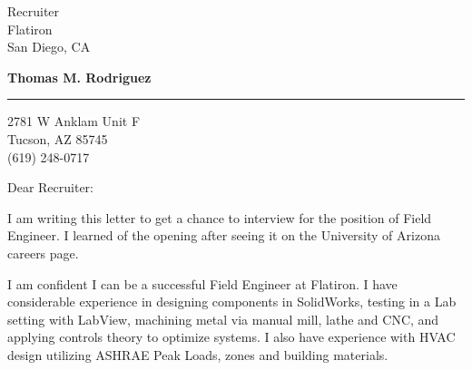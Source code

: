 \documentclass{letter} %
\begin{document}
\signature{Thomas M. Rodriguez}           %
\longindentation=0pt                       %
\let\raggedleft\raggedright                %
 
 
\begin{letter}{Recruiter \\
Flatiron \\
San Diego, CA}

\begin{center}
{\large\bf Thomas M. Rodriguez}
\end{center}
\medskip\hrule height 1pt
\begin{center}
{2781 W Anklam Unit F \\ Tucson, AZ 85745 \\ (619) 248-0717}
\end{center} \vfill %
 
 
\opening{Dear Recruiter:} 
 

\noindent I am writing this letter to get a chance to interview for the position of Field Engineer.  I learned of the opening after seeing it on the University of Arizona careers page.
 

\noindent I am confident I can be a successful Field Engineer at Flatiron.  I have considerable experience in designing components in SolidWorks, testing in a Lab setting with LabView, machining metal via manual mill, lathe and CNC, and applying controls theory to optimize systems.  I also have experience with HVAC design utilizing ASHRAE Peak Loads, zones and building materials.


\end{letter}
\end{document}
